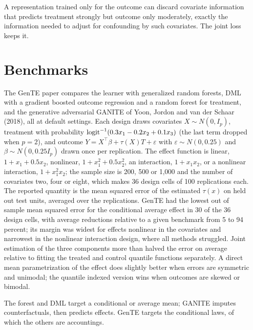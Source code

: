 \begin{remark}
A representation trained only for the outcome can discard covariate information that predicts treatment strongly but outcome only moderately, exactly the information needed to adjust for confounding by such covariates. The joint loss keeps it.
\end{remark}

\section{Benchmarks}

The GenTE paper compares the learner with generalized random forests, DML with a gradient boosted outcome regression and a random forest for treatment, and the generative adversarial GANITE of Yoon, Jordon and van der Schaar (2018), all at default settings. Each design draws covariates $X \sim N(0, I_p)$, treatment with probability $\operatorname{logit}^{-1}(0.3x_1 - 0.2x_2 + 0.1x_3)$ (the last term dropped when $p = 2$), and outcome $Y = X^\top\beta + \tau(X)T + \varepsilon$ with $\varepsilon \sim N(0, 0.25)$ and $\beta \sim N(0, 0.25 I_p)$ drawn once per replication. The effect function is linear, $1 + x_1 + 0.5x_2$, nonlinear, $1 + x_1^2 + 0.5x_2^2$, an interaction, $1 + x_1x_2$, or a nonlinear interaction, $1 + x_1^2x_2$; the sample size is 200, 500 or 1,000 and the number of covariates two, four or eight, which makes 36 design cells of 100 replications each. The reported quantity is the mean squared error of the estimated $\tau(x)$ on held out test units, averaged over the replications. GenTE had the lowest out of sample mean squared error for the conditional average effect in 30 of the 36 design cells, with average reductions relative to a given benchmark from 5 to 94 percent; its margin was widest for effects nonlinear in the covariates and narrowest in the nonlinear interaction design, where all methods struggled. Joint estimation of the three components more than halved the error on average relative to fitting the treated and control quantile functions separately. A direct mean parametrization of the effect does slightly better when errors are symmetric and unimodal; the quantile indexed version wins when outcomes are skewed or bimodal.

 The forest and DML target a conditional or average mean; GANITE imputes counterfactuals, then predicts effects. GenTE targets the conditional laws, of which the others are accountings.

